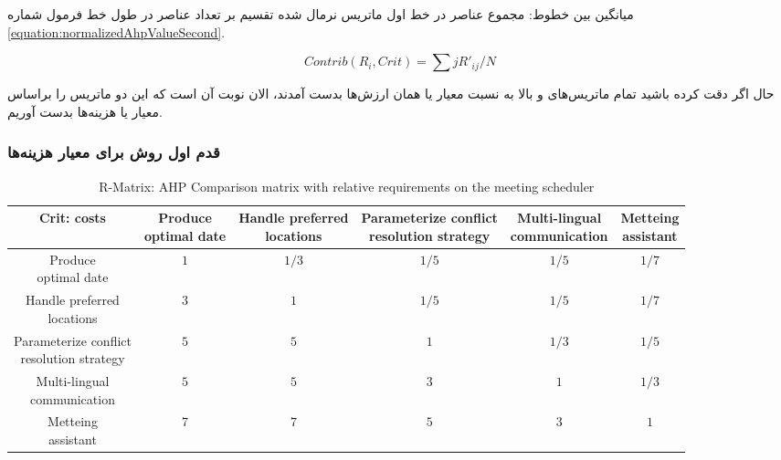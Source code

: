 میانگین بین خطوط: مجموع عناصر در خط اول ماتریس نرمال شده تقسیم بر تعداد عناصر در
طول خط فرمول شماره \ref{equation:normalizedAhpValueSecond}.

\begin{equation}
    Contrib(R_i, Crit) = \sum{j}R'_{ij}/N
    \label{equation:normalizedAhpValueSecond}
\end{equation}

حال اگر دقت کرده باشید تمام ماتریس‌های  و  بالا به نسبت معیار
 یا همان ارزش‌ها بدست آمدند، الان نوبت آن است که این دو ماتریس را
براساس معیار  یا هزینه‌ها بدست آوریم.

\subsubsection{قدم اول روش  برای معیار هزینه‌ها}

\begin{LTR}
    \begin{table}[H]
        \centering
        \begin{tabular}{cccccc}
            Crit: costs & \makecell{Produce \\ optimal date} & \makecell{Handle preferred \\ locations} & \makecell{Parameterize conflict \\ resolution strategy} & \makecell{Multi-lingual \\ communication} & \makecell{Metteing \\ assistant} \\ \hline
            \makecell{Produce \\ optimal date} & $1$ & $1/3$ & $1/5$ & $1/5$ & $1/7$ \\ \hline
            \makecell{Handle preferred \\ locations} & $3$ & $1$ & $1/5$ & $1/5$ & $1/7$  \\ \hline
            \makecell{Parameterize conflict \\ resolution strategy} & $5$ & $5$ & $1$ & $1/3$ & $1/5$ \\ \hline
            \makecell{Multi-lingual \\ communication} & $5$ & $5$ & $3$ & $1$ & $1/3$ \\ \hline
            \makecell{Metteing \\ assistant} & $7$ & $7$ & $5$ & $3$ & $1$ \\
        \end{tabular}
        \caption{R-Matrix: AHP Comparison matrix with relative requirements on
        the meeting scheduler}
        \label{fig:ahpCostComparison}
    \end{table}
\end{LTR}

